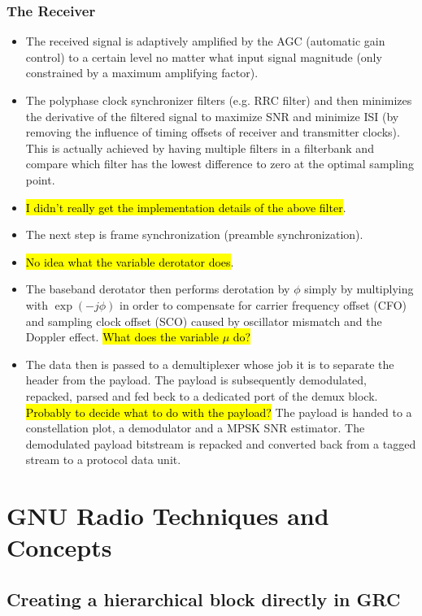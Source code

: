 \documentclass{article}
\begin{document}
\subsubsection{The Receiver}

\begin{itemize}
	\item The received signal is adaptively amplified by the AGC (automatic gain control) to a certain level no matter what input signal magnitude (only constrained by a maximum amplifying factor).
	\item The polyphase clock synchronizer filters (e.g. RRC filter) and then minimizes the derivative of the filtered signal to maximize SNR and minimize ISI (by removing the influence of timing offsets of receiver and transmitter clocks). This is actually achieved by having multiple filters in a filterbank and compare which filter has the lowest difference to zero at the optimal sampling point.
	\item \hl{I didn't really get the implementation details of the above filter}.
	\item The next step is frame synchronization (preamble synchronization).
	\item \hl{No idea what the variable derotator does}.
	\item  The baseband derotator then performs derotation by $\phi$ simply by multiplying with $\exp(-j\phi)$ in order to compensate for carrier frequency offset (CFO) and sampling clock offset (SCO) caused by oscillator mismatch and the Doppler effect. \hl{What does the variable $\mu$ do?}
	\item The data then is passed to a demultiplexer whose job it is to separate the header from the payload. The payload is subsequently demodulated, repacked, parsed and fed beck to a dedicated port of the demux block. \hl{Probably to decide what to do with the payload?} The payload is handed to a constellation plot, a demodulator and a MPSK SNR estimator. The demodulated payload bitstream is repacked and converted back from a tagged stream to a protocol data unit.
\end{itemize}

\section{GNU Radio Techniques and Concepts}

\subsection{Creating a hierarchical block directly in GRC}
\end{document}
